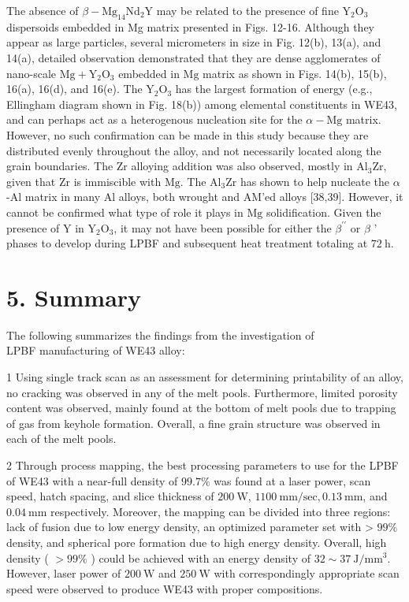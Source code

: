 \documentclass[10pt]{article}
\begin{document}
The absence of $\beta-\mathrm{Mg}_{14} \mathrm{Nd}_{2} \mathrm{Y}$ may be related to the presence of fine $\mathrm{Y}_{2} \mathrm{O}_{3}$ dispersoids embedded in Mg matrix presented in Figs. 12-16. Although they appear as large particles, several micrometers in size in Fig. 12(b), 13(a), and 14(a), detailed observation demonstrated that they are dense agglomerates of nano-scale $\mathrm{Mg}+\mathrm{Y}_{2} \mathrm{O}_{3}$ embedded in $\mathrm{Mg}$ matrix as shown in Figs. 14(b), 15(b), 16(a), 16(d), and 16(e). The $\mathrm{Y}_{2} \mathrm{O}_{3}$ has the largest formation of energy (e.g., Ellingham diagram shown in Fig. 18(b)) among elemental constituents in WE43, and can perhaps act as a heterogenous nucleation site for the $\alpha-\mathrm{Mg}$ matrix. However, no such confirmation can be made in this study because they are distributed evenly throughout the alloy, and not necessarily located along the grain boundaries. The $\mathrm{Zr}$ alloying addition was also observed, mostly in $\mathrm{Al}_{3} \mathrm{Zr}$, given that $\mathrm{Zr}$ is immiscible with $\mathrm{Mg}$. The $\mathrm{Al}_{3} \mathrm{Zr}$ has shown to help nucleate the $\alpha$-Al matrix in many $\mathrm{Al}$ alloys, both wrought and AM'ed alloys [38,39]. However, it cannot be confirmed what type of role it plays in $\mathrm{Mg}$ solidification. Given the presence of $\mathrm{Y}$ in $\mathrm{Y}_{2} \mathrm{O}_{3}$, it may not have been possible for either the $\beta^{\prime \prime}$ or $\beta$ ' phases to develop during LPBF and subsequent heat treatment totaling at $72 \mathrm{~h}$.

\section*{5. Summary}
The following summarizes the findings from the investigation of\\
LPBF manufacturing of WE43 alloy:

1 Using single track scan as an assessment for determining printability of an alloy, no cracking was observed in any of the melt pools. Furthermore, limited porosity content was observed, mainly found at the bottom of melt pools due to trapping of gas from keyhole formation. Overall, a fine grain structure was observed in each of the melt pools.

2 Through process mapping, the best processing parameters to use for the LPBF of WE43 with a near-full density of $99.7 \%$ was found at a laser power, scan speed, hatch spacing, and slice thickness of $200 \mathrm{~W}$, $1100 \mathrm{~mm} / \mathrm{sec}, 0.13 \mathrm{~mm}$, and $0.04 \mathrm{~mm}$ respectively. Moreover, the mapping can be divided into three regions: lack of fusion due to low energy density, an optimized parameter set with > $99 \%$ density, and spherical pore formation due to high energy density. Overall, high density ( $>99 \%$ ) could be achieved with an energy density of $32 \sim 37 \mathrm{~J} / \mathrm{mm}^{3}$. However, laser power of $200 \mathrm{~W}$ and $250 \mathrm{~W}$ with correspondingly appropriate scan speed were observed to produce WE43 with proper compositions.
\end{document}
